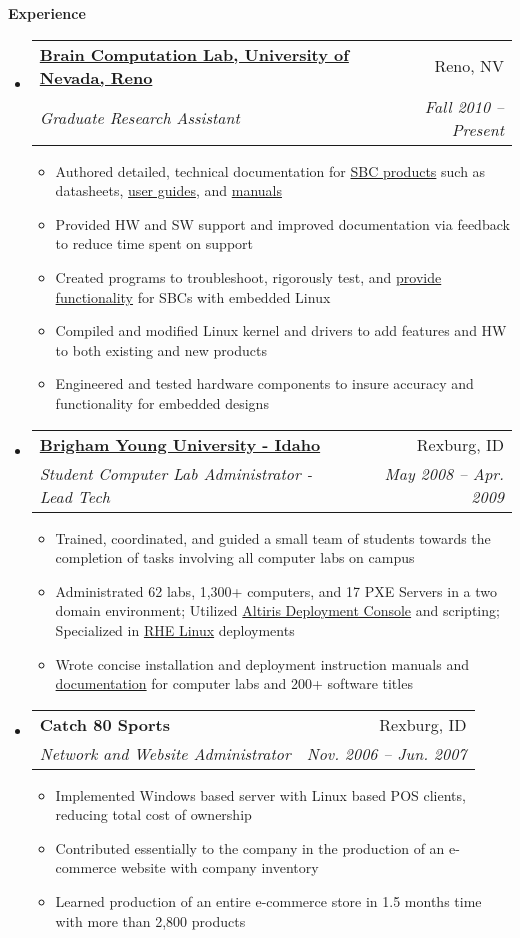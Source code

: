 \documentclass[letterpaper,11pt]{article}
\makeatletter
\newcommand{\resitem}[1]{\item #1 \vspace{-2pt}}
\newcommand{\resheading}[1]{{\large \colorbox{mygrey}{\begin{minipage}{\textwidth}{\textbf{#1 \vphantom{p\^{E}}}}\end{minipage}}}}
\newcommand{\ressubheading}[4]{
\begin{tabular*}{6.5in}{l@{\extracolsep{\fill}}r}
		\textbf{#1} & #2 \\
		\textit{#3} & \textit{#4} \\
\end{tabular*}\vspace{-6pt}}
\makeatother
\begin{document}
\resheading{Experience}
	\begin{itemize}
		\item 
			\ressubheading{\href{http://www.cse.unr.edu/brain/}{Brain Computation Lab, University of Nevada, Reno}}{Reno, NV}{Graduate Research Assistant}{Fall 2010 -- Present}
				{ \footnotesize
				\begin{itemize}
					\resitem{Authored detailed, technical documentation for \href{http://www.embeddedarm.com/products/index.php}{SBC products} such as datasheets,  \href{http://www.embeddedarm.com/about/resource.php?item=410}{user guides}, and \href{http://www.embeddedarm.com/about/resource.php?item=409}{manuals}}
					\resitem{Provided HW and SW support and improved documentation via feedback to reduce time spent on support}
					\resitem{Created programs to troubleshoot, rigorously test, and \href{ftp://ftp.embeddedarm.com/ts-arm-sbc/ts-7500-linux/samples/sbus.c}{provide functionality} for SBCs with embedded Linux}
					\resitem{Compiled and modified Linux kernel and drivers to add features and HW to both existing and new products}
					\resitem{Engineered and tested hardware components to insure accuracy and functionality for embedded designs}
				\end{itemize}
				}
		\item
			\ressubheading{\href{http://www.byui.edu}{Brigham Young University - Idaho}}{Rexburg, ID}{Student Computer Lab Administrator - Lead Tech}{May 2008 -- Apr. 2009}
				{ \footnotesize
				\begin{itemize}
					\resitem{Trained, coordinated, and guided a small team of students towards the completion of tasks involving all computer labs on campus}
					\resitem{Administrated 62 labs, 1,300+ computers, and 17 PXE Servers in a two domain environment;  Utilized \href{http://www.symantec.com/business/deployment-solution}{Altiris Deployment Console} and scripting;  Specialized in \href{http://www.redhat.com/rhel/}{RHE Linux} deployments}
					\resitem{Wrote concise installation and deployment instruction manuals and \href{http://www.derekhildreth.com/portfolio/Documentation/Lab_Binder_Documentation_BYUI_Work.pdf}{documentation} for computer labs and 200+ software titles}
				\end{itemize}
          			}
		\item 
			\ressubheading{Catch 80 Sports}{Rexburg, ID}{Network and Website Administrator}{Nov. 2006 -- Jun. 2007}
				{ \footnotesize
				\begin{itemize}
					\resitem{Implemented Windows based server with Linux based POS clients, reducing total cost of ownership}
					\resitem{Contributed essentially to the company in the production of an e-commerce website with company inventory}
					\resitem{Learned production of an entire e-commerce store in 1.5 months time with more than 2,800 products}
				\end{itemize}
				}


\end{itemize}
\end{document}
